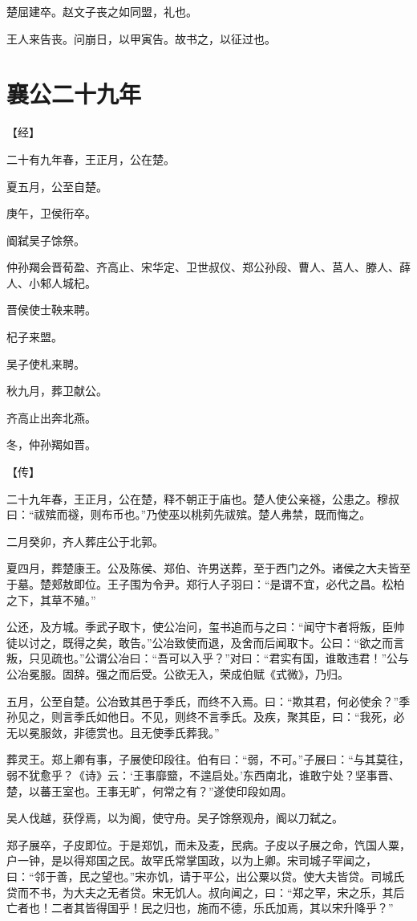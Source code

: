\documentclass[a4paper,12pt,UTF8,twoside]{ctexbook}
\begin{document}
楚屈建卒。赵文子丧之如同盟，礼也。

王人来告丧。问崩日，以甲寅告。故书之，以征过也。

\section{襄公二十九年}



【经】

二十有九年春，王正月，公在楚。

夏五月，公至自楚。

庚午，卫侯衎卒。

阍弑吴子馀祭。

仲孙羯会晋荀盈、齐高止、宋华定、卫世叔仪、郑公孙段、曹人、莒人、滕人、薛人、小邾人城杞。

晋侯使士鞅来聘。

杞子来盟。

吴子使札来聘。

秋九月，葬卫献公。

齐高止出奔北燕。

冬，仲孙羯如晋。

【传】

二十九年春，王正月，公在楚，释不朝正于庙也。楚人使公亲襚，公患之。穆叔曰：“祓殡而襚，则布币也。”乃使巫以桃茢先祓殡。楚人弗禁，既而悔之。

二月癸卯，齐人葬庄公于北郭。

夏四月，葬楚康王。公及陈侯、郑伯、许男送葬，至于西门之外。诸侯之大夫皆至于墓。楚郏敖即位。王子围为令尹。郑行人子羽曰：“是谓不宜，必代之昌。松柏之下，其草不殖。”

公还，及方城。季武子取卞，使公冶问，玺书追而与之曰：“闻守卞者将叛，臣帅徒以讨之，既得之矣，敢告。”公冶致使而退，及舍而后闻取卞。公曰：“欲之而言叛，只见疏也。”公谓公冶曰：“吾可以入乎？”对曰：“君实有国，谁敢违君！”公与公冶冕服。固辞。强之而后受。公欲无入，荣成伯赋《式微》，乃归。

五月，公至自楚。公冶致其邑于季氏，而终不入焉。曰：“欺其君，何必使余？”季孙见之，则言季氏如他日。不见，则终不言季氏。及疾，聚其臣，曰：“我死，必无以冕服敛，非德赏也。且无使季氏葬我。”

葬灵王。郑上卿有事，子展使印段往。伯有曰：“弱，不可。”子展曰：“与其莫往，弱不犹愈乎？《诗》云：‘王事靡盬，不遑启处。’东西南北，谁敢宁处？坚事晋、楚，以蕃王室也。王事无旷，何常之有？”遂使印段如周。

吴人伐越，获俘焉，以为阍，使守舟。吴子馀祭观舟，阍以刀弑之。

郑子展卒，子皮即位。于是郑饥，而未及麦，民病。子皮以子展之命，饩国人粟，户一钟，是以得郑国之民。故罕氏常掌国政，以为上卿。宋司城子罕闻之，曰：“邻于善，民之望也。”宋亦饥，请于平公，出公粟以贷。使大夫皆贷。司城氏贷而不书，为大夫之无者贷。宋无饥人。叔向闻之，曰：“郑之罕，宋之乐，其后亡者也！二者其皆得国乎！民之归也，施而不德，乐氏加焉，其以宋升降乎？”
\end{document}
